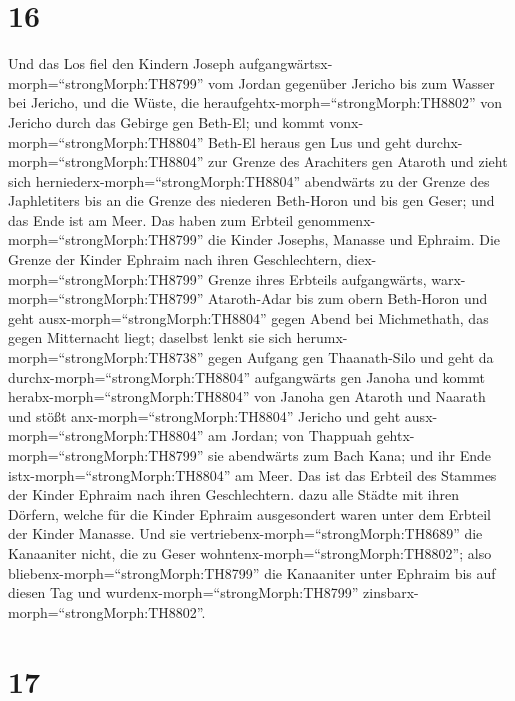 \hypertarget{section-15}{%
\section{16}\label{section-15}}

 Und das Los fiel den Kindern Joseph
aufgangwärtsx-morph=``strongMorph:TH8799'' vom Jordan gegenüber Jericho
bis zum Wasser bei Jericho, und die Wüste, die
heraufgehtx-morph=``strongMorph:TH8802'' von Jericho durch das Gebirge
gen Beth-El;  und kommt vonx-morph=``strongMorph:TH8804''
Beth-El heraus gen Lus und geht durchx-morph=``strongMorph:TH8804'' zur
Grenze des Arachiters gen Ataroth  und zieht sich
herniederx-morph=``strongMorph:TH8804'' abendwärts zu der Grenze des
Japhletiters bis an die Grenze des niederen Beth-Horon und bis gen
Geser; und das Ende ist am Meer.  Das haben zum Erbteil
genommenx-morph=``strongMorph:TH8799'' die Kinder Josephs, Manasse und
Ephraim.  Die Grenze der Kinder Ephraim nach ihren
Geschlechtern, diex-morph=``strongMorph:TH8799'' Grenze ihres Erbteils
aufgangwärts, warx-morph=``strongMorph:TH8799'' Ataroth-Adar bis zum
obern Beth-Horon  und geht ausx-morph=``strongMorph:TH8804''
gegen Abend bei Michmethath, das gegen Mitternacht liegt; daselbst lenkt
sie sich herumx-morph=``strongMorph:TH8738'' gegen Aufgang gen
Thaanath-Silo und geht da durchx-morph=``strongMorph:TH8804''
aufgangwärts gen Janoha  und kommt
herabx-morph=``strongMorph:TH8804'' von Janoha gen Ataroth und Naarath
und stößt anx-morph=``strongMorph:TH8804'' Jericho und geht
ausx-morph=``strongMorph:TH8804'' am Jordan;  von Thappuah
gehtx-morph=``strongMorph:TH8799'' sie abendwärts zum Bach Kana; und ihr
Ende istx-morph=``strongMorph:TH8804'' am Meer. Das ist das Erbteil des
Stammes der Kinder Ephraim nach ihren Geschlechtern.  dazu
alle Städte mit ihren Dörfern, welche für die Kinder Ephraim
ausgesondert waren unter dem Erbteil der Kinder Manasse. 
Und sie vertriebenx-morph=``strongMorph:TH8689'' die Kanaaniter nicht,
die zu Geser wohntenx-morph=``strongMorph:TH8802''; also
bliebenx-morph=``strongMorph:TH8799'' die Kanaaniter unter Ephraim bis
auf diesen Tag und wurdenx-morph=``strongMorph:TH8799''
zinsbarx-morph=``strongMorph:TH8802''.

\hypertarget{section-16}{%
\section{17}\label{section-16}}

